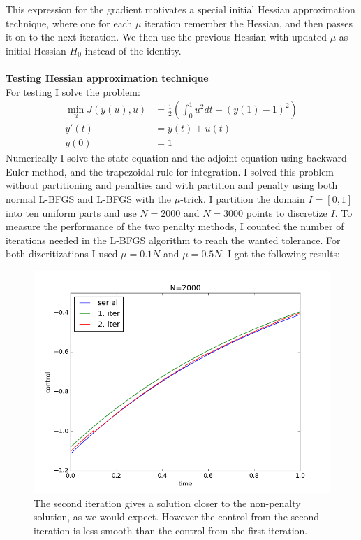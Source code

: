 \documentclass[11pt,a4paper]{report}
\begin{document}
This expression for the gradient motivates a special initial Hessian approximation technique, where one for each $\mu$ iteration remember the Hessian, and then passes it on to the next iteration. We then use the previous Hessian with updated $\mu$ as initial Hessian $H_0$ instead of the identity.
\\
\\
\textbf{Testing Hessian approximation technique} 
\\
For testing I solve the problem:
\begin{align*}
\min_{u} J(y(u),u) &= \frac{1}{2}(\int_0^1 u^2 dt + (y(1)-1)^2) \\
y'(t) &= y(t) +u(t) \\
y(0) &=1
\end{align*}
Numerically I solve the state equation and the adjoint equation using backward Euler method, and the trapezoidal rule for integration. I solved this problem without partitioning and penalties and with partition and penalty using both normal L-BFGS and L-BFGS with the $\mu$-trick. I partition the domain $I=[0,1]$ into ten uniform parts and use $N=2000$ and $N=3000$ points to discretize $I$. To measure the performance of the two penalty methods, I counted the number of iterations needed in the L-BFGS algorithm to reach the wanted tolerance. For both dizcritizations I used $\mu=0.1N$ and $\mu=0.5N$. I got the following results: 
\begin{figure}
  \includegraphics[width=\linewidth]{mufail2000.png}
  \caption{The second iteration gives a solution closer to the non-penalty solution, as we would expect. However the control from the second iteration is less smooth than the control from the first iteration.}
  \label{Fig 1}
\end{figure}
\end{document}
